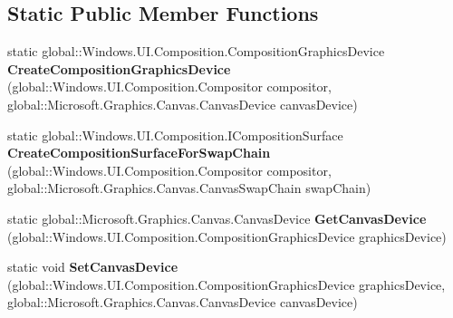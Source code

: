 \subsection*{Static Public Member Functions}
\begin{DoxyCompactItemize}
\item 
\mbox{\label{class_microsoft_1_1_graphics_1_1_canvas_1_1_u_i_1_1_composition_1_1_canvas_composition_a3b9f17ccd00ef34c54c31646a4186a94}} 
static global\+::\+Windows.\+U\+I.\+Composition.\+Composition\+Graphics\+Device {\bfseries Create\+Composition\+Graphics\+Device} (global\+::\+Windows.\+U\+I.\+Composition.\+Compositor compositor, global\+::\+Microsoft.\+Graphics.\+Canvas.\+Canvas\+Device canvas\+Device)
\item 
\mbox{\label{class_microsoft_1_1_graphics_1_1_canvas_1_1_u_i_1_1_composition_1_1_canvas_composition_a5b9957a9a95828b0fb6d0e5cacbaa376}} 
static global\+::\+Windows.\+U\+I.\+Composition.\+I\+Composition\+Surface {\bfseries Create\+Composition\+Surface\+For\+Swap\+Chain} (global\+::\+Windows.\+U\+I.\+Composition.\+Compositor compositor, global\+::\+Microsoft.\+Graphics.\+Canvas.\+Canvas\+Swap\+Chain swap\+Chain)
\item 
\mbox{\label{class_microsoft_1_1_graphics_1_1_canvas_1_1_u_i_1_1_composition_1_1_canvas_composition_a3b6e31d08196ba66744cad30ed1a1e1c}} 
static global\+::\+Microsoft.\+Graphics.\+Canvas.\+Canvas\+Device {\bfseries Get\+Canvas\+Device} (global\+::\+Windows.\+U\+I.\+Composition.\+Composition\+Graphics\+Device graphics\+Device)
\item 
\mbox{\label{class_microsoft_1_1_graphics_1_1_canvas_1_1_u_i_1_1_composition_1_1_canvas_composition_a80598aedf841c5ed7457b3b96fd2b114}} 
static void {\bfseries Set\+Canvas\+Device} (global\+::\+Windows.\+U\+I.\+Composition.\+Composition\+Graphics\+Device graphics\+Device, global\+::\+Microsoft.\+Graphics.\+Canvas.\+Canvas\+Device canvas\+Device)
\item 
\mbox{\label{class_microsoft_1_1_graphics_1_1_canvas_1_1_u_i_1_1_composition_1_1_canvas_composition_a1f8acd780668173cb52fdc3fcbcdc428}} 

\end{DoxyCompactItemize}
